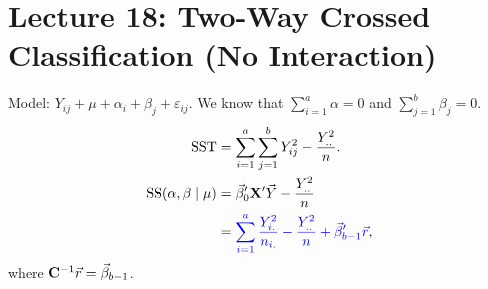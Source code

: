 \section{Lecture 18: Two-Way Crossed Classification (No Interaction)}
Model: $ Y_{ij}+\mu+\alpha_i+\beta_j+\varepsilon_{ij} $. We know that
$ \sum_{i=1}^{a}\alpha=0 $ and $ \sum_{j=1}^{b}\beta_j=0 $.
\begin{align*}
    \text{SST}
     & =\sum_{i=1}^{a}\sum_{j=1}^{b}Y_{ij}^2-\frac{Y_{..}^2}{n}.                  \\
    \text{SS}(\alpha,\beta\mid \mu)
     & =\vec{\beta}_0'\mathbf{X}'\vec{Y}-\frac{Y_{..}^2}{n}                 \\
     & =\textcolor{blue}{\sum_{i=1}^{a}\frac{Y_{i.}^2}{n_{i.}}-\frac{Y_{..}^2}{n}
        +\vec{\beta}_{b-1}'\vec{r}},
\end{align*}
where $ \mathbf{C}^{-1}\vec{r}=\vec{\beta}_{b-1} $.
